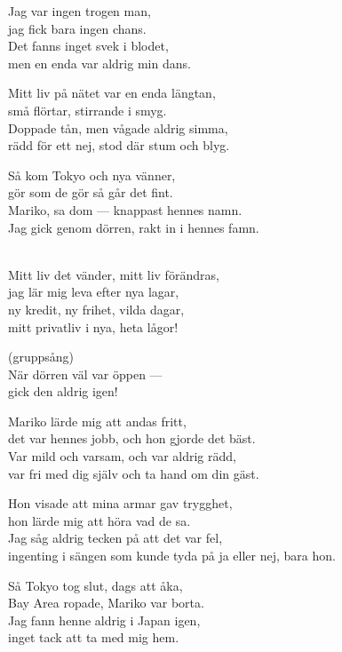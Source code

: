 \begin{lyrics}
Jag var ingen trogen man,\\
jag fick bara ingen chans.\\
Det fanns inget svek i blodet,\\
men en enda var aldrig min dans.

Mitt liv på nätet var en enda längtan,\\
små flörtar, stirrande i smyg.\\
Doppade tån, men vågade aldrig simma,\\
rädd för ett nej, stod där stum och blyg.

Så kom Tokyo och nya vänner,\\
gör som de gör så går det fint.\\
Mariko, sa dom — knappast hennes namn.\\
Jag gick genom dörren, rakt in i hennes famn.

\\
Mitt liv det vänder, mitt liv förändras,\\
jag lär mig leva efter nya lagar,\\
ny kredit, ny frihet, vilda dagar,\\
mitt privatliv i nya, heta lågor!

 (gruppsång)\\
När dörren väl var öppen —\\
gick den aldrig igen!

Mariko lärde mig att andas fritt,\\
det var hennes jobb, och hon gjorde det bäst.\\
Var mild och varsam, och var aldrig rädd,\\
var fri med dig själv och ta hand om din gäst.

Hon visade att mina armar gav trygghet,\\
hon lärde mig att höra vad de sa.\\
Jag såg aldrig tecken på att det var fel,\\
ingenting i sängen som kunde tyda på ja eller nej, bara hon.

Så Tokyo tog slut, dags att åka,\\
Bay Area ropade, Mariko var borta.\\
Jag fann henne aldrig i Japan igen,\\
inget tack att ta med mig hem.


\end{lyrics}
